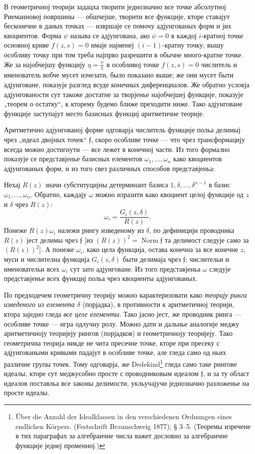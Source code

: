 ﻿\documentclass[11pt]{article}
\providecommand{\frf}{\mathfrak f}
\begin{document}
В геометричној теорији задацха творити једнозначно все точке абсолутној Риеманновој површины --- обшчејше, творити все функције, кторе ставајут бесконечне в даных точках --- извршаје се помочу адјунгованых форм и јих квоциентов. Форма \(\psi\) называ се адјунгована, ако \(\psi=0\) в каждој \(i\)-кратној точке основној криве \(f(z,s)=0\) имаје најменеј \((i-1)\)-кратну точку; вышу особливу точку при том треба најпрво разрешити в обычне много-кратне точке. Же за најобчејшу функцију \(\eta=\frac{\psi}{\chi}\) в особливој точке \(f(z,s)=0\) числитель и именователь вобче мусет изчезати, было показано выше; же они мусет быти адјунговане, показује разглед всуде конечных диференциалов. Же обратно условја адјунгованости сут такоже достатне за творјенье најобчејшеј функције, показује „теорем о остатку“, к кторему будемо ближе преходити ниже. Тако адјунговане функције заступајут место базисных функциј аритметичне теорије.

Аритметично адјунгованој форме одговарја числитель функције польа делимыј чрез „идеал двојных точек“ \(\frf\), скоро особливе точке --- что чрез трансформацију всегда можно достигнути --- все лежет в конечној части. Из того формално показује се представјенье базисных елементов \(\omega_1,\ldots,\omega_n\) како квоциентов адјунгованых форм, и из того свез различных способов представјеньа:

Нехај \(R(z)\) значи субституцијны детерминант базиса \(1,\delta,\ldots,\delta^{n-1}\) в базис \(\omega_1,\ldots,\omega_n\). Обратно, каждају \(\omega\) можно изразити како квоциент целој функције од \(z\) и \(\delta\) чрез \(R(z)\):
\[
\omega_i=\frac{G_i(z,\delta)}{R(z)}.
\]
Понеже \(R(z)\omega_i\) належи рингу изведеному из \(\delta\), по дефиницији проводника \(R(z)\) јест делимы чрез \(\frf\) [из \((R(z))^2=\operatorname{Norm}\frf\) та делимост следује само за \((R(z))^2\)]. А понеже \(\omega_i\), како цела функција, остава конечна за все конечне \(z\), муси и числителна функција \(G_i(z,\delta)\) быти делимаја чрез \(\frf\); числительи и именовательи всех \(\omega_i\) сут зато адјунговане. Из того представјеньа \(\omega\) следује представјенье всех функциј польа чрез квоциенты адјунгованых.

По предходечем геометричну теорију можно карактеризовати како {\itshape теорију ринга изведеного из елемента \(\delta\)} (порјадка), в противности к аритметичној теорији, ктора заједно гледа {\itshape все целе елементы}. Тако јасно јест, же проводник ринга --- особливе точке --- игра одлучну ролу. Можно дати и дальнье аналогије меджу аритметичноју теоријеју рингов (порјадков) и геометричноју теоријеју. Тако геометрична теорија никде не чита пресечне точке, кторе при пресеку с адјунговаными кривыми падајут в особливе точке, але гледа само од ньих различне групы точек. Тому одговарја, же Dedekind\footnote{Über die Anzahl der Idealklassen in den verschiedenen Ordnungen eines endlichen Körpers. (Festschrift Braunschweig 1877); § 3--5. (Теоремы изречене в тих параграфах за алгебраичне числа важет дословно за алгебраичне функције једнеј променној.)} гледа само таке рингове идеалы, кторе сут меджусобно просте с проводниковым идеалом \(\frf\), и за ту област идеалов поставльа все законы делимости, укльучајучи једнозначно разложенье на просте идеалы.
\end{document}
